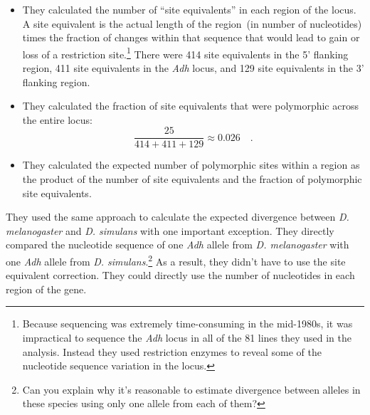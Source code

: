 \documentclass[12pt]{article}
\begin{document}
\begin{itemize}

\item They calculated the number of ``site equivalents'' in each
  region of the locus. A site equivalent is the actual length of the
  region~(in number of nucleotides) times the fraction of changes
  within that sequence that would lead to gain or loss of a
  restriction site.\footnote{Because sequencing was extremely
    time-consuming in the mid-1980s, it was impractical to sequence
    the {\it Adh\/} locus in all of the 81 lines they used in the
    analysis. Instead they used restriction enzymes to reveal some of
    the nucleotide sequence variation in the locus.} There were 414
  site equivalents in the 5' flanking region, 411 site equivalents in
  the {\it Adh\/} locus, and 129 site equivalents in the 3' flanking
  region.

\item They calculated the fraction of site equivalents that were
  polymorphic across the entire locus:
\[
\frac{25}{414+411+129} \approx 0.026 \quad .
\]

\item They calculated the expected number of polymorphic sites within
  a region as the product of the number of site equivalents and the
  fraction of polymorphic site equivalents.

\end{itemize}

\noindent They used the same approach to calculate the expected
divergence between {\it D. melanogaster\/} and {\it D. simulans\/}
with one important exception. They directly compared the nucleotide
sequence of one {\it Adh\/} allele from {\it D. melanogaster\/} with
one {\it Adh\/} allele from {\it D. simulans}.\footnote{Can you
  explain why it's reasonable to estimate divergence between alleles
  in these species using only one allele from each of them?} As a
result, they didn't have to use the site equivalent correction. They
could directly use the number of nucleotides in each region of the
gene.
\end{document}
